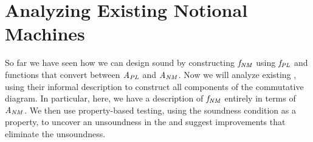 \section{Analyzing Existing Notional Machines}
\label{chr:RevealingInconsistencies}

So far we have seen
how we can design sound \nms{} by
constructing \ensuremath{\Varid{f}_{\Conid{NM}}} using \ensuremath{\Varid{f}_{\Conid{PL}}} and
functions that convert between \ensuremath{\Conid{A}_{\Conid{PL}}} and \ensuremath{\Conid{A}_{\Conid{NM}}}.
%
Now we will analyze existing \nms{},
using their informal description to construct all components of the commutative diagram.
In particular, here,
we have a description
of \ensuremath{\Varid{f}_{\Conid{NM}}} entirely in terms of \ensuremath{\Conid{A}_{\Conid{NM}}}.
%
We then use property-based testing, using the soundness condition as a property,
to uncover an unsoundness in the \nm{}
and suggest improvements that eliminate the unsoundness.

















